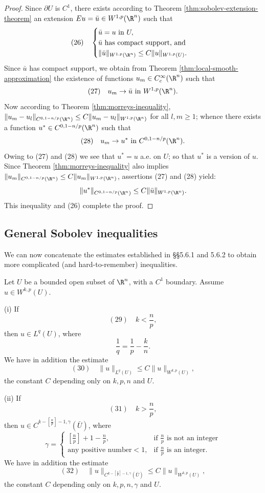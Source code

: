 \begin{proof}
Since $\partial U$ is $C^1$, there exists according to Theorem \ref{thm:sobolev-extension-theorem} an extension $E u = \bar{u} \in W^{1,p}(\R^n)$ such that
$$(26) \quad \begin{cases}
\bar{u} = u \text{ in } U, \\
\bar{u} \text{ has compact support, and} \\
\|\bar{u}\|_{W^{1,p}(\R^n)} \le C\|u\|_{W^{1,p}(U)}.
\end{cases}$$
Since $\bar{u}$ has compact support, we obtain from Theorem \ref{thm:local-smooth-approximation} the existence of functions $u_m \in C_c^\infty(\R^n)$ such that
$$(27) \quad u_m \to \bar{u} \text{ in } W^{1,p}(\R^n).$$
Now according to Theorem \ref{thm:morreys-inequality}, $\|u_m - u_l\|_{C^{0,1-n/p}(\R^n)} \le C\|u_m - u_l\|_{W^{1,p}(\R^n)}$ for all $l, m \ge 1$; whence there exists a function $u^* \in C^{0,1-n/p}(\R^n)$ such that
$$(28) \quad u_m \to u^* \text{ in } C^{0,1-n/p}(\R^n).$$
Owing to (27) and (28) we see that $u^* = u$ a.e. on $U$; so that $u^*$ is a version of $u$. Since Theorem \ref{thm:morreys-inequality} also implies $\|u_m\|_{C^{0,1-n/p}(\R^n)} \le C\|u_m\|_{W^{1,p}(\R^n)}$, assertions (27) and (28) yield:
$$\|u^*\|_{C^{0,1-n/p}(\R^n)} \le C\|\bar{u}\|_{W^{1,p}(\R^n)}.$$
This inequality and (26) complete the proof.
\end{proof}

\subsection{General Sobolev inequalities}

We can now concatenate the estimates established in §§5.6.1 and 5.6.2 to obtain more complicated (and hard-to-remember) inequalities.

\begin{theorem}
\label{thm:general-sobolev-inequalities}
Let $U$ be a bounded open subset of $\R^n$, with a $C^1$ boundary. Assume $u \in W^{k,p}(U)$.

(i) If
$$(29) \quad k < \frac{n}{p},$$
then $u \in L^q(U)$, where
$$\frac{1}{q} = \frac{1}{p} - \frac{k}{n}.$$
We have in addition the estimate
$$(30) \quad \|u\|_{L^q(U)} \le C\|u\|_{W^{k,p}(U)},$$
the constant $C$ depending only on $k, p, n$ and $U$.

(ii) If
$$(31) \quad k > \frac{n}{p},$$
then $u \in C^{k-[\frac{n}{p}]-1,\gamma}(\bar{U})$, where
$$\gamma = \begin{cases}
\left[\frac{n}{p}\right] + 1 - \frac{n}{p}, & \text{if } \frac{n}{p} \text{ is not an integer} \\
\text{any positive number} < 1, & \text{if } \frac{n}{p} \text{ is an integer}.
\end{cases}$$
We have in addition the estimate
$$(32) \quad \|u\|_{C^{k-[\frac{n}{p}]-1,\gamma}(\bar{U})} \le C\|u\|_{W^{k,p}(U)},$$
the constant $C$ depending only on $k, p, n, \gamma$ and $U$.
\end{theorem}

